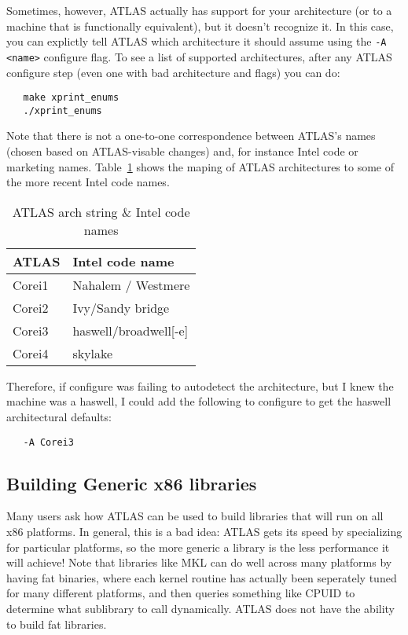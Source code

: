 \documentclass[11pt]{article}
\begin{document}
Sometimes, however, ATLAS actually has support for your architecture
(or to a machine that is functionally equivalent), but it doesn't recognize
it.  In this case, you can explictly tell ATLAS which architecture it should
assume using the \verb+-A <name>+ configure flag.  To see a list of supported
architectures, after any ATLAS configure step (even one with bad architecture 
and flags) you can do:
\begin{verbatim}
   make xprint_enums
   ./xprint_enums
\end{verbatim}

Note that there is not a one-to-one correspondence between ATLAS's names
(chosen based on ATLAS-visable changes) and, for instance Intel code 
or marketing names.  Table~\ref{arch-intel} shows the maping of ATLAS
architectures to some of the more recent Intel code names.
\begin{table}
\begin{center}
\begin{tabular}{|l|l|}\hline\hline
{\bf ATLAS} & {\bf Intel code name}\\\hline\hline
Corei1 & Nahalem / Westmere \\\hline
Corei2 & Ivy/Sandy bridge \\\hline
Corei3 & haswell/broadwell[-e] \\\hline
Corei4 & skylake \\\hline\hline
\end{tabular}
\end{center}
\caption{ATLAS arch string \& Intel code names}
\label{arch-intel}
\end{table}

Therefore, if configure was failing to autodetect the architecture, but
I knew the machine was a haswell, I could add the following to configure
to get the haswell architectural defaults:
\begin{verbatim}
   -A Corei3
\end{verbatim}

\subsection{Building Generic x86 libraries}
Many users ask how ATLAS can be used to build libraries that will run on
all x86 platforms.  In general, this is a bad idea: ATLAS gets its speed by
specializing for particular platforms, so the more generic a library is the
less performance it will achieve!  Note that libraries like MKL can do well
across many platforms by having fat binaries, where each kernel routine has
actually
been seperately tuned for many different platforms, and then queries something
like CPUID
to determine what sublibrary to call dynamically.  ATLAS does not have the
ability to build fat libraries.
\end{document}
